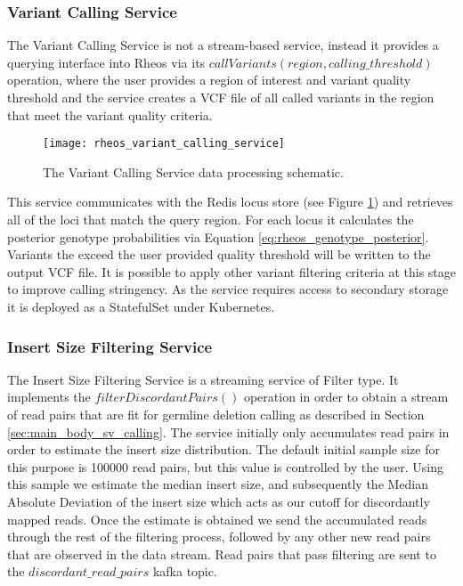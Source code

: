 \subsubsection{Variant Calling Service}

The Variant Calling Service is not a stream-based service, instead it provides a querying interface into Rheos via its $callVariants(region, calling\_threshold)$ operation, where the user provides a region of interest and variant quality threshold and the service creates a VCF file of all called variants in the region that meet the variant quality criteria. 

\begin{figure}[h!]
    \texttt{[image: rheos\_variant\_calling\_service]}
    \centering
    \caption {The Variant Calling Service data processing schematic.}
    \label{fig:rheos_variant_calling_service}
\end{figure}

This service communicates with the Redis locus store (see Figure \ref{fig:rheos_variant_calling_service}) and retrieves all of the loci that match the query region. For each locus it calculates the posterior genotype probabilities via Equation \ref{eq:rheos_genotype_posterior}. Variants the exceed the user provided quality threshold will be written to the output VCF file. It is possible to apply other variant filtering criteria at this stage to improve calling stringency. As the service requires access to secondary storage it is deployed as a StatefulSet under Kubernetes.

\subsubsection{Insert Size Filtering Service}

The Insert Size Filtering Service is a streaming service of Filter type. It implements the $filterDiscordantPairs()$ operation in order to obtain a stream of read pairs that are fit for germline deletion calling as described in Section \ref{sec:main_body_sv_calling}. The service initially only accumulates read pairs in order to estimate the insert size distribution. The default initial sample size for this purpose is 100000 read pairs, but this value is controlled by the user. Using this sample we estimate the median insert size, and subsequently the Median Absolute Deviation of the insert size which acts as our cutoff for discordantly mapped reads. Once the estimate is obtained we send the accumulated reads through the rest of the filtering process, followed by any other new read pairs that are observed in the data stream. Read pairs that pass filtering are sent to the $discordant\_read\_pairs$ kafka topic. 

